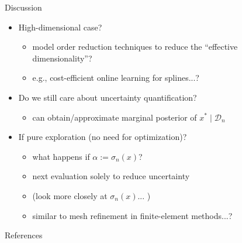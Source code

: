 \documentclass[aspectratio=169]{beamer}					%
\begin{document}
\begin{frame}{Discussion}
	\begin{itemize}
		\item High-dimensional case? 
		\begin{itemize}
			\item model order reduction techniques to reduce the ``effective dimensionality''?	
			\item e.g., cost-efficient online learning for splines...?
		\end{itemize}
		\pause
		\item Do we still care about uncertainty quantification? 
		\begin{itemize}
			\item can obtain/approximate marginal posterior of $x^* \mid \mathcal{D}_n$ 
		\end{itemize}
		\pause
		\item If pure exploration (no need for optimization)? 
		\begin{itemize}
			\item what happens if $\alpha := \sigma_n(x)$?
			\item next evaluation solely to reduce uncertainty
			\item (look more closely at $\sigma_n(x)$... )
			\item similar to mesh refinement in finite-element methods...? \cite{lo19983d,jones1997adaptive}
		\end{itemize}
		
	\end{itemize}
\end{frame}


\begin{frame}[allowframebreaks]{References}
 
	

\end{frame}
\end{document}
